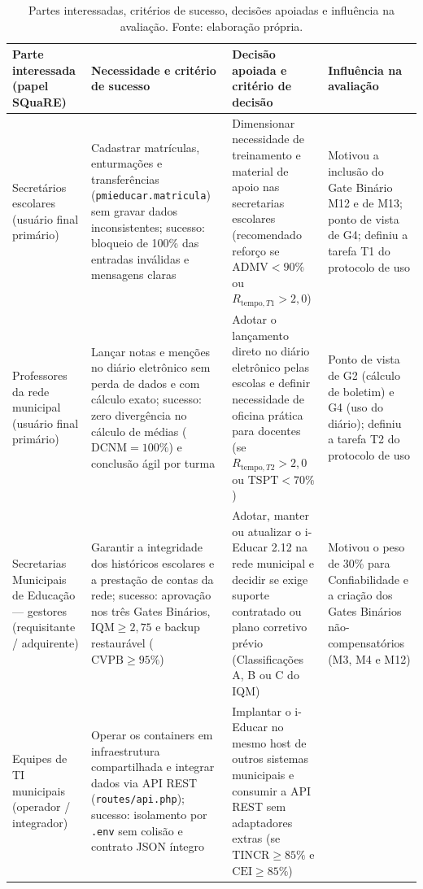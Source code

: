 \documentclass[conference]{model/IEEEtran}%
\begin{document}
\begin{table}[!t]
\centering
\caption{Partes interessadas, critérios de sucesso, decisões apoiadas e influência na avaliação. Fonte: elaboração própria.}
\label{tab:stakeholders}
\scriptsize
\setlength{\tabcolsep}{3.5pt}
\begin{tabular}{@{}L{2.8cm}L{4.8cm}L{4.8cm}L{4.4cm}@{}}
\toprule
\textbf{Parte interessada (papel SQuaRE)} & \textbf{Necessidade e critério de sucesso} & \textbf{Decisão apoiada e critério de decisão} & \textbf{Influência na avaliação} \\
\midrule
Secretários escolares (usuário final primário) &
Cadastrar matrículas, enturmações e transferências (\texttt{pmieducar.matricula}) sem gravar dados inconsistentes; sucesso: bloqueio de 100\% das entradas inválidas e mensagens claras &
Dimensionar necessidade de treinamento e material de apoio nas secretarias escolares (recomendado reforço se $\text{ADMV} < 90\%$ ou $R_{\text{tempo},T1} > 2{,}0$) &
Motivou a inclusão do Gate Binário M12 e de M13; ponto de vista de G4; definiu a tarefa T1 do protocolo de uso \\
\addlinespace[2pt]
Professores da rede municipal (usuário final primário) &
Lançar notas e menções no diário eletrônico sem perda de dados e com cálculo exato; sucesso: zero divergência no cálculo de médias ($\text{DCNM} = 100\%$) e conclusão ágil por turma &
Adotar o lançamento direto no diário eletrônico pelas escolas e definir necessidade de oficina prática para docentes (se $R_{\text{tempo},T2} > 2{,}0$ ou $\text{TSPT} < 70\%$) &
Ponto de vista de G2 (cálculo de boletim) e G4 (uso do diário); definiu a tarefa T2 do protocolo de uso \\
\addlinespace[2pt]
Secretarias Municipais de Educação --- gestores (requisitante / adquirente) &
Garantir a integridade dos históricos escolares e a prestação de contas da rede; sucesso: aprovação nos três Gates Binários, $\text{IQM} \ge 2{,}75$ e backup restaurável ($\text{CVPB} \ge 95\%$) &
Adotar, manter ou atualizar o i-Educar 2.12 na rede municipal e decidir se exige suporte contratado ou plano corretivo prévio (Classificações A, B ou C do IQM) &
Motivou o peso de 30\% para Confiabilidade e a criação dos Gates Binários não-compensatórios (M3, M4 e M12) \\
\addlinespace[2pt]
Equipes de TI municipais (operador / integrador) &
Operar os containers em infraestrutura compartilhada e integrar dados via API REST (\texttt{routes/api.php}); sucesso: isolamento por \texttt{.env} sem colisão e contrato JSON íntegro &
Implantar o i-Educar no mesmo host de outros sistemas municipais e consumir a API REST sem adaptadores extras (se $\text{TINCR} \ge 85\%$ e $\text{CEI} \ge 85\%$) &

\end{tabular}
\end{table}
\end{document}
